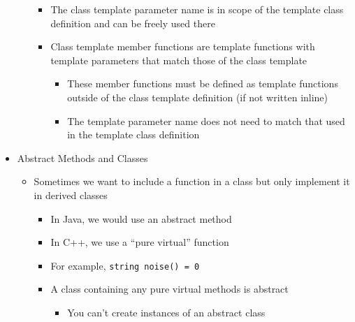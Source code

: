 \begin{itemize}
\begin{itemize}
        \begin{itemize}

          \item The class template parameter name is in scope of the template class definition and can be freely used there

          \item Class template member functions are template functions with template parameters that match those of the class template

            \begin{itemize}

              \item These member functions must be defined as template functions outside of the class template definition (if not written inline)

              \item The template parameter name does not need to match that used in the template class definition

            \end{itemize}

        \end{itemize}

    \end{itemize}

  \item Abstract Methods and Classes

    \begin{itemize}

      \item Sometimes we want to include a function in a class but only implement it in derived classes

        \begin{itemize}

          \item In Java, we would use an abstract method

          \item In C++, we use a ``pure virtual'' function

          \item For example, \texttt{string noise() = 0}

          \item A class containing any pure virtual methods is abstract

            \begin{itemize}

              \item You can't create instances of an abstract class


\end{itemize}
\end{itemize}
\end{itemize}
\end{itemize}
